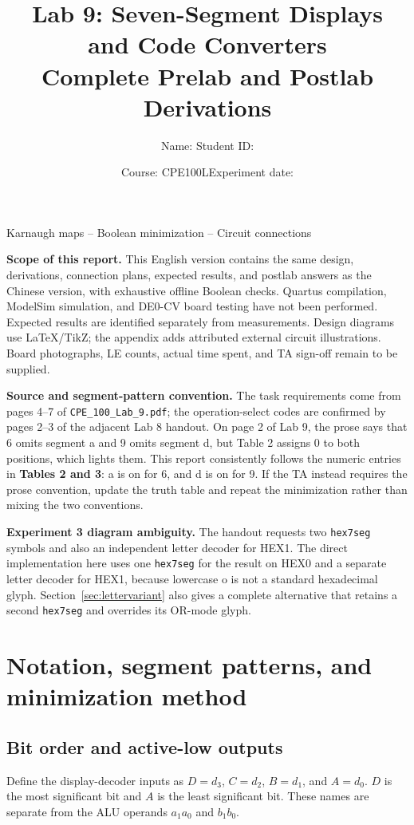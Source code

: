 \documentclass[a4paper,11pt]{article}
\title{\textbf{Lab 9: Seven-Segment Displays\\and Code Converters}\\[0.5em]\large Complete Prelab and Postlab Derivations}
\author{Name: \underline{\hspace{3cm}}\qquad Student ID: \underline{\hspace{3cm}}}
\date{Course: CPE100L\qquad Experiment date: \underline{\hspace{2.5cm}}}
\begin{document}
\maketitle
\begin{center}\large\textcolor{accent}{Karnaugh maps -- Boolean minimization -- Circuit connections}\end{center}

\noindent\textbf{Scope of this report.} This English version contains the same design,
derivations, connection plans, expected results, and postlab answers as the Chinese version,
with exhaustive offline Boolean checks. Quartus compilation, ModelSim simulation, and
DE0-CV board testing have not been performed. Expected results are identified separately
from measurements. Design diagrams use LaTeX/TikZ; the appendix adds attributed external circuit illustrations. Board photographs, LE counts,
actual time spent, and TA sign-off remain to be supplied.

\noindent\textbf{Source and segment-pattern convention.} The task requirements come from
pages 4--7 of \texttt{CPE\_100\_Lab\_9.pdf}; the operation-select codes are confirmed by
pages 2--3 of the adjacent Lab 8 handout. On page 2 of Lab 9, the prose says that 6 omits
segment a and 9 omits segment d, but Table 2 assigns 0 to both positions, which lights them.
This report consistently follows the numeric entries in \textbf{Tables 2 and 3}: a is on
for 6, and d is on for 9. If the TA instead requires the prose convention, update the
truth table and repeat the minimization rather than mixing the two conventions.

\noindent\textbf{Experiment 3 diagram ambiguity.} The handout requests two
\texttt{hex7seg} symbols and also an independent letter decoder for HEX1. The direct
implementation here uses one \texttt{hex7seg} for the result on HEX0 and a separate
letter decoder for HEX1, because lowercase o is not a standard hexadecimal glyph.
Section~\ref{sec:lettervariant} also gives a complete alternative that retains a second
\texttt{hex7seg} and overrides its OR-mode glyph.

\clearpage\begingroup\small\setlength{\parskip}{0pt}\tableofcontents\endgroup
\clearpage
\section{Notation, segment patterns, and minimization method}
\subsection{Bit order and active-low outputs}
Define the display-decoder inputs as $D=d_3$, $C=d_2$, $B=d_1$, and $A=d_0$.
$D$ is the most significant bit and $A$ is the least significant bit. These names are
separate from the ALU operands $a_1a_0$ and $b_1b_0$.
\end{document}
